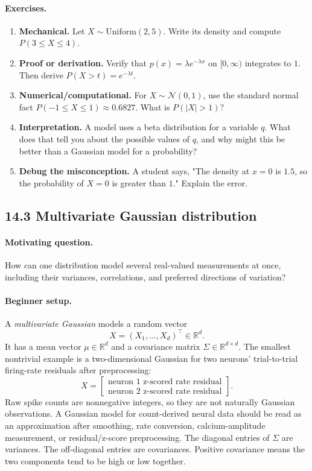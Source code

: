 \paragraph{Exercises.}
\begin{enumerate}[label=\textbf{14.2.\arabic*.}, leftmargin=*]
\item \textbf{Mechanical.} Let \(X\sim\mathrm{Uniform}(2,5)\). Write its density and compute \(P(3\leq X\leq4)\).
\item \textbf{Proof or derivation.} Verify that \(p(x)=\lambda e^{-\lambda x}\) on \([0,\infty)\) integrates to \(1\). Then derive \(P(X>t)=e^{-\lambda t}\).
\item \textbf{Numerical/computational.} For \(X\sim\mathcal N(0,1)\), use the standard normal fact \(P(-1\leq X\leq1)\approx0.6827\). What is \(P(|X|>1)\)?
\item \textbf{Interpretation.} A model uses a beta distribution for a variable \(q\). What does that tell you about the possible values of \(q\), and why might this be better than a Gaussian model for a probability?
\item \textbf{Debug the misconception.} A student says, "The density at \(x=0\) is \(1.5\), so the probability of \(X=0\) is greater than \(1\)." Explain the error.
\end{enumerate}

\subsection{14.3 Multivariate Gaussian distribution}

\paragraph{Motivating question.}
How can one distribution model several real-valued measurements at once, including their variances, correlations, and preferred directions of variation?

\paragraph{Beginner setup.}
A \emph{multivariate Gaussian} models a random vector
\[
X=(X_1,\ldots,X_d)^\top\in\mathbb R^d.
\]
It has a mean vector \(\mu\in\mathbb R^d\) and a covariance matrix \(\Sigma\in\mathbb R^{d\times d}\). The smallest nontrivial example is a two-dimensional Gaussian for two neurons' trial-to-trial firing-rate residuals after preprocessing:
\[
X=
\begin{bmatrix}
\text{neuron 1 z-scored rate residual}\\
\text{neuron 2 z-scored rate residual}
\end{bmatrix}.
\]
Raw spike counts are nonnegative integers, so they are not naturally Gaussian observations. A Gaussian model for count-derived neural data should be read as an approximation after smoothing, rate conversion, calcium-amplitude measurement, or residual/z-score preprocessing.
The diagonal entries of \(\Sigma\) are variances. The off-diagonal entries are covariances. Positive covariance means the two components tend to be high or low together.

